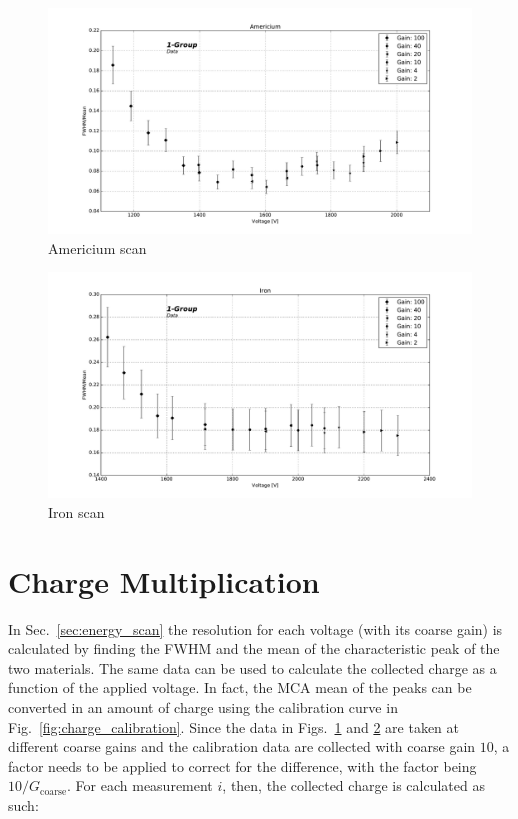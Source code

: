 \begin{figure}[htbp]
  \includegraphics[width=\linewidth]{graphics/americium_scan}
  \caption{Americium scan}
  \label{fig:resolution:americium}
\end{figure}

\begin{figure}[htbp]
  \includegraphics[width=\linewidth]{graphics/iron_scan}
  \caption{Iron scan}
  \label{fig:resolution:iron}
\end{figure}



\section{Charge Multiplication}
\label{sec:systematics}

In Sec.~\ref{sec:energy_scan} the resolution for each voltage (with its coarse gain) is calculated by finding the FWHM and the mean of the characteristic peak of the two materials.
The same data can be used to calculate the collected charge as a function of the applied voltage. In fact, the MCA mean of the peaks can be converted in an amount of charge using the calibration curve in Fig.~\ref{fig:charge_calibration}. Since the data in Figs.~\ref{fig:resolution:americium} and \ref{fig:resolution:iron} are taken at different coarse gains and the calibration data are collected with coarse gain $10$, a factor needs to be applied to correct for the difference, with the factor being $10/G_\mathrm{coarse}$. For each measurement $i$, then, the collected charge is calculated as such:

